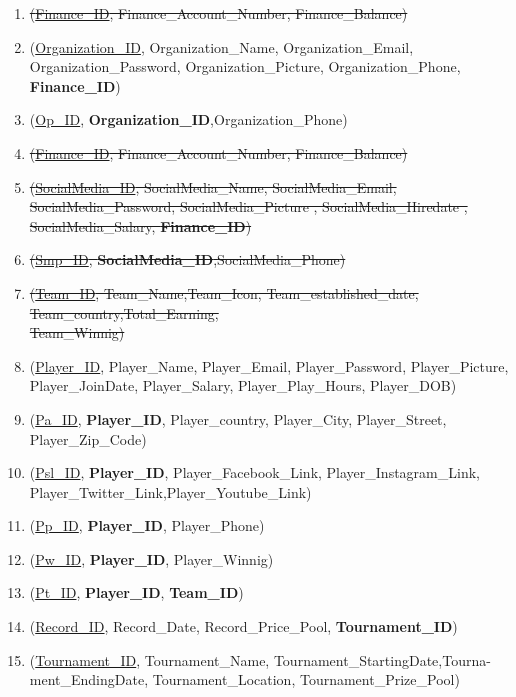 \begin{enumerate}
    \item \sout{(\underline{Finance\_ID}, Finance\_Account\_Number, Finance\_Balance)}
    \item (\underline{Organization\_ID}, Organization\_Name, Organization\_Email, Organization\_Password, Organization\_Picture, Organization\_Phone, \textbf{Finance\_ID})
    \item  (\underline{Op\_ID}, \textbf{Organization\_ID},{Organization\_Phone})


    \item \sout{(\underline{Finance\_ID}, Finance\_Account\_Number, Finance\_Balance)}
    \item \sout{(\underline{SocialMedia\_ID}, SocialMedia\_Name, SocialMedia\_Email, SocialMedia\_Password, SocialMedia\_Picture ,  SocialMedia\_Hiredate , SocialMedia\_Salary, \textbf{Finance\_ID})}
    \item \sout{ (\underline{Smp\_ID}, \textbf{SocialMedia\_ID},{SocialMedia\_Phone})}



    \item \sout{(\underline{Team\_ID}, Team\_Name,Team\_Icon, Team\_established\_date, Team\_country,Total\_Earning,\\Team\_Winnig)}
    \item (\underline{Player\_ID}, Player\_Name, Player\_Email, Player\_Password, Player\_Picture, Player\_JoinDate, Player\_Salary, Player\_Play\_Hours, Player\_DOB)
    \item  (\underline{Pa\_ID}, \textbf{Player\_ID}, Player\_country, Player\_City, Player\_Street, Player\_Zip\_Code)
    \item  (\underline{Psl\_ID}, \textbf{Player\_ID}, Player\_Facebook\_Link, Player\_Instagram\_Link, Player\_Twitter\_Link,Player\_Youtube\_Link)
    \item  (\underline{Pp\_ID}, \textbf{Player\_ID}, Player\_Phone)
    \item  (\underline{Pw\_ID}, \textbf{Player\_ID}, Player\_Winnig)
    \item  (\underline{Pt\_ID}, \textbf{Player\_ID}, \textbf{Team\_ID})


    \item (\underline{Record\_ID}, Record\_Date, Record\_Price\_Pool, \textbf{Tournament\_ID})
    \item (\underline{Tournament\_ID}, Tournament\_Name, Tournament\_StartingDate,Tourna-\\ment\_EndingDate, Tournament\_Location, Tournament\_Prize\_Pool)



\end{enumerate}
